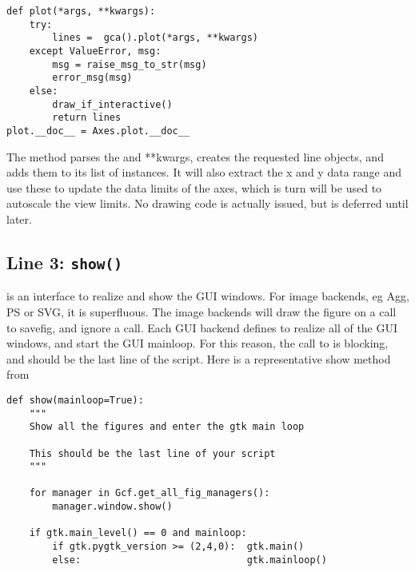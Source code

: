 \documentclass[twoside]{book}
\begin{document}
\begin{lstlisting}                    
def plot(*args, **kwargs):
    try:
        lines =  gca().plot(*args, **kwargs)
    except ValueError, msg:
        msg = raise_msg_to_str(msg)
        error_msg(msg)
    else:
        draw_if_interactive()
        return lines
plot.__doc__ = Axes.plot.__doc__
\end{lstlisting}

The  method parses the 
and {**kwargs}, creates the requested line objects, and adds them to
its list of  instances.  It will also extract the x and
y data range and use these to update the data limits of the axes,
which is turn will be used to autoscale the view limits.  No drawing
code is actually issued, but is deferred until later.

\subsection*{Line 3: \texttt{show()}}

 is an interface to realize and show the GUI windows.  For
image backends, eg Agg, PS or SVG, it is superfluous.  The image
backends will draw the figure on a call to savefig, and ignore a
 call.  Each GUI backend defines  to realize all
of the GUI windows, and start the GUI mainloop.  For this reason, the
call to  is blocking, and should be the last line of the
script.  Here is a representative show method from

\begin{lstlisting}
def show(mainloop=True):
    """
    Show all the figures and enter the gtk main loop

    This should be the last line of your script
    """

    for manager in Gcf.get_all_fig_managers():
        manager.window.show()
        
    if gtk.main_level() == 0 and mainloop:
        if gtk.pygtk_version >= (2,4,0):  gtk.main()
        else:                             gtk.mainloop()


\end{lstlisting}
\end{document}

